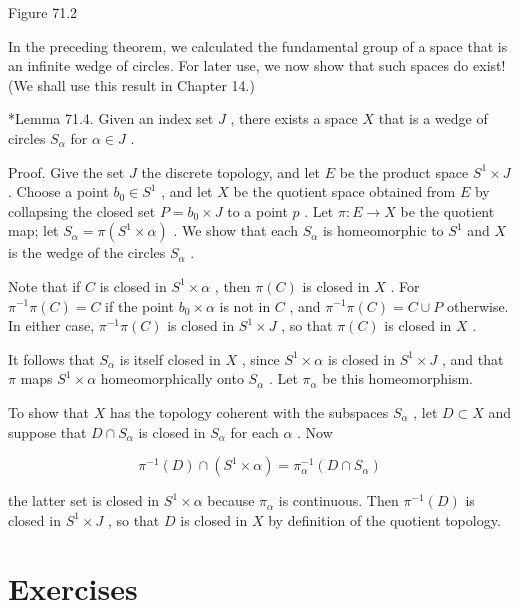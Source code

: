 Figure 71.2

In the preceding theorem, we calculated the fundamental group of a space that is an infinite wedge of circles. For later use, we now show that such spaces do exist! (We shall use this result in Chapter 14.)

*Lemma 71.4. Given an index set \(J\) , there exists a space \(X\) that is a wedge of circles \({S}_{\alpha }\) for \(\alpha  \in  J\) .

Proof. Give the set \(J\) the discrete topology, and let \(E\) be the product space \({S}^{1} \times  J\) . Choose a point \({b}_{0} \in  {S}^{1}\) , and let \(X\) be the quotient space obtained from \(E\) by collapsing the closed set \(P = {b}_{0} \times  J\) to a point \(p\) . Let \(\pi  : E \rightarrow  X\) be the quotient map; let \({S}_{\alpha } = \pi \left( {{S}^{1} \times  \alpha }\right)\) . We show that each \({S}_{\alpha }\) is homeomorphic to \({S}^{1}\) and \(X\) is the wedge of the circles \({S}_{\alpha }\) .

Note that if \(C\) is closed in \({S}^{1} \times  \alpha\) , then \(\pi \left( C\right)\) is closed in \(X\) . For \({\pi }^{-1}\pi \left( C\right)  = C\) if the point \({b}_{0} \times  \alpha\) is not in \(C\) , and \({\pi }^{-1}\pi \left( C\right)  = C \cup  P\) otherwise. In either case, \({\pi }^{-1}\pi \left( C\right)\) is closed in \({S}^{1} \times  J\) , so that \(\pi \left( C\right)\) is closed in \(X\) .

It follows that \({S}_{\alpha }\) is itself closed in \(X\) , since \({S}^{1} \times  \alpha\) is closed in \({S}^{1} \times  J\) , and that \(\pi\) maps \({S}^{1} \times  \alpha\) homeomorphically onto \({S}_{\alpha }\) . Let \({\pi }_{\alpha }\) be this homeomorphism.

To show that \(X\) has the topology coherent with the subspaces \({S}_{\alpha }\) , let \(D \subset  X\) and suppose that \(D \cap  {S}_{\alpha }\) is closed in \({S}_{\alpha }\) for each \(\alpha\) . Now

\[
{\pi }^{-1}\left( D\right)  \cap  \left( {{S}^{1} \times  \alpha }\right)  = {\pi }_{\alpha }^{-1}\left( {D \cap  {S}_{\alpha }}\right)
\]

the latter set is closed in \({S}^{1} \times  \alpha\) because \({\pi }_{\alpha }\) is continuous. Then \({\pi }^{-1}\left( D\right)\) is closed in \({S}^{1} \times  J\) , so that \(D\) is closed in \(X\) by definition of the quotient topology.

\section*{Exercises}

